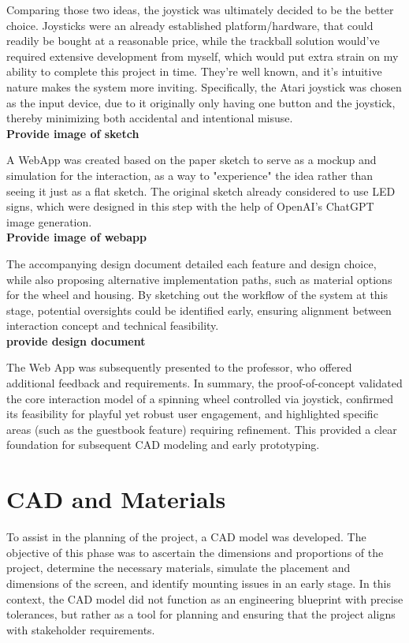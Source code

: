 Comparing those two ideas, the joystick was ultimately decided to be the better choice. Joysticks were an already established platform/hardware, that could readily be bought at a reasonable price, while the trackball solution would've required extensive development from myself, which would put extra strain on my ability to complete this project in time. They're well known, and it's intuitive nature makes the system more inviting.
Specifically, the Atari joystick was chosen as the input device, due to it originally only having one button and the joystick, thereby minimizing both accidental and intentional misuse.\\ 
\textbf{Provide image of sketch}

A WebApp was created based on the paper sketch to serve as a mockup and simulation for the interaction, as a way to "experience" the idea rather than seeing it just as a flat sketch. The original sketch already considered to use LED signs, which were designed in this step with the help of OpenAI's ChatGPT image generation.\\
\textbf{Provide image of webapp}

The accompanying design document detailed each feature and design choice, while also proposing alternative implementation paths, such as material options for the wheel and housing. By sketching out the workflow of the system at this stage, potential oversights could be identified early, ensuring alignment between interaction concept and technical feasibility.\\
\textbf{provide design document}

The Web App was subsequently presented to the professor, who offered additional feedback and requirements. 
In summary, the proof-of-concept validated the core interaction model of a spinning wheel controlled via joystick, confirmed its feasibility for playful yet robust user engagement, and highlighted specific areas (such as the guestbook feature) requiring refinement. This provided a clear foundation for subsequent CAD modeling and early prototyping.\\

\section{CAD and Materials}
To assist in the planning of the project, a CAD model was developed. The objective of this phase was to ascertain the dimensions and proportions of the project, determine the necessary materials, simulate the placement and dimensions of the screen, and identify mounting issues in an early stage. 
In this context, the CAD model did not function as an engineering blueprint with precise tolerances, but rather as a tool for planning and ensuring that the project aligns with stakeholder requirements.

